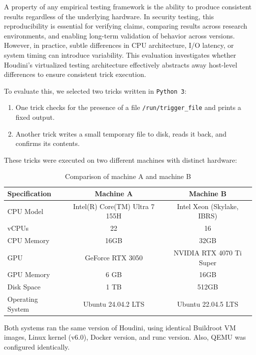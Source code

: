 \begin{doublespace}
A property of any empirical testing framework is the ability to produce consistent results regardless of the underlying hardware. In security testing, this reproducibility is essential for verifying claims, comparing results across research environments, and enabling long-term validation of behavior across versions. However, in practice, subtle differences in CPU architecture, I/O latency, or system timing can introduce variability. This evaluation investigates whether Houdini’s virtualized testing architecture effectively abstracts away host-level differences to ensure consistent trick execution.

To evaluate this, we selected two tricks written in \texttt{Python 3}:

\begin{enumerate}
    \item One trick checks for the presence of a file \texttt{/run/trigger\_file} and prints a fixed output.
    \item Another trick writes a small temporary file to disk, reads it back, and confirms its contents.
\end{enumerate}

These tricks were executed on two different machines with distinct hardware:

\begin{table}[h]
\centering
\caption{Comparison of machine A and machine B}
\label{tab:machine-comparison}
\begin{tabular}{|l|c|c|}
\hline
\textbf{Specification} & \textbf{Machine A} & \textbf{Machine B} \\
\hline
CPU Model & Intel(R) Core(TM) Ultra 7 155H & Intel Xeon (Skylake, IBRS) \\
vCPUs & 22 & 16 \\
CPU Memory & 16GB & 32GB \\
GPU & GeForce RTX 3050 & NVIDIA RTX 4070 Ti Super \\
GPU Memory & 6 GB & 16GB \\
Disk Space & 1 TB & 512GB \\
Operating System & Ubuntu 24.04.2 LTS & Ubuntu 22.04.5 LTS \\
\hline
\end{tabular}
\end{table}

Both systems ran the same version of Houdini, using identical Buildroot VM images, Linux kernel (v6.0), Docker version, and runc version. Also, QEMU was configured identically.


\end{doublespace}
